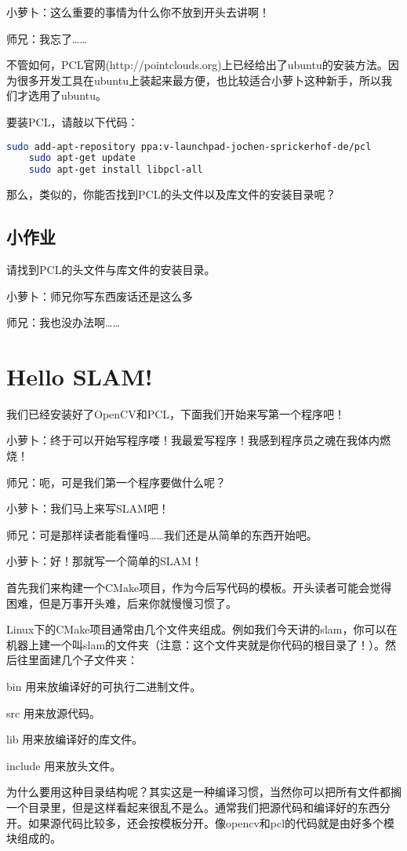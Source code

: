 \documentclass[9pt,a4paper]{article}
\begin{document}
\begin{itemize}
	小萝卜：这么重要的事情为什么你不放到开头去讲啊！
	
	师兄：我忘了……
	
	不管如何，PCL官网(http://pointclouds.org)上已经给出了ubuntu的安装方法。因为很多开发工具在ubuntu上装起来最方便，也比较适合小萝卜这种新手，所以我们才选用了ubuntu。
	
	要装PCL，请敲以下代码：
	\begin{lstlisting}[language=sh]
	sudo add-apt-repository ppa:v-launchpad-jochen-sprickerhof-de/pcl
	sudo apt-get update
	sudo apt-get install libpcl-all
	\end{lstlisting}
	
	那么，类似的，你能否找到PCL的头文件以及库文件的安装目录呢？
	\begin{framed}  
	\subsection*{小作业}
	请找到PCL的头文件与库文件的安装目录。
	\end{framed}
	
	
	
\end{itemize}

小萝卜：师兄你写东西废话还是这么多~

师兄：我也没办法啊……

\section{Hello SLAM!}
我们已经安装好了OpenCV和PCL，下面我们开始来写第一个程序吧！

小萝卜：终于可以开始写程序喽！我最爱写程序！我感到程序员之魂在我体内燃烧！

师兄：呃，可是我们第一个程序要做什么呢？

小萝卜：我们马上来写SLAM吧！

师兄：可是那样读者能看懂吗……我们还是从简单的东西开始吧。

小萝卜：好！那就写一个简单的SLAM！

首先我们来构建一个CMake项目，作为今后写代码的模板。开头读者可能会觉得困难，但是万事开头难，后来你就慢慢习惯了。

Linux下的CMake项目通常由几个文件夹组成。例如我们今天讲的slam，你可以在机器上建一个叫slam的文件夹（注意：这个文件夹就是你代码的根目录了！）。然后往里面建几个子文件夹：
\begin{framed}
\begin{description}
	\item{bin} 用来放编译好的可执行二进制文件。
	\item{src} 用来放源代码。
	\item{lib} 用来放编译好的库文件。
	\item{include} 用来放头文件。
\end{description}
\end{framed}
为什么要用这种目录结构呢？其实这是一种编译习惯，当然你可以把所有文件都搁一个目录里，但是这样看起来很乱不是么。通常我们把源代码和编译好的东西分开。如果源代码比较多，还会按模板分开。像opencv和pcl的代码就是由好多个模块组成的。
\end{document}
